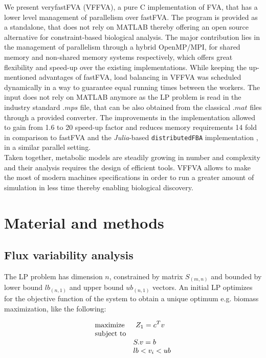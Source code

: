 \documentclass[letterpaper, 10 pt, conference]{ieeeconf}  %
\begin{document}
We present veryfastFVA (VFFVA), a pure C implementation of FVA, that has a lower level management of parallelism over fastFVA. The program is provided as a standalone, that does not rely on MATLAB thereby offering an open source alternative for constraint-based biological analysis. The major contribution lies in the management of parallelism through a hybrid OpenMP/MPI, for shared memory and non-shared memory systems respectively, which offers great flexibility and speed-up over the existing implementations. While keeping the up-mentioned advantages of fastFVA, load balancing in VFFVA was scheduled dynamically \cite{suss2008common} in a way to guarantee equal running times between the workers. The input does not rely on MATLAB anymore as the LP problem is read in the industry standard $.mps$ file, that can be also obtained from the classical $.mat$ files through a provided converter. The improvements in the implementation allowed to gain from 1.6 to 20 speed-up factor and reduces memory requirements 14 fold in comparison to fastFVA and the \textit{Julia}-based \texttt{distributedFBA} implementation \cite{heirendt2016distributedfba}, in a similar parallel setting.\\
Taken together, metabolic models are steadily growing in number and complexity and their analysis requires the design of efficient tools. VFFVA allows to make the most of modern machines specifications in order to run a greater amount of simulation in less time thereby enabling biological discovery. 

\section{Material and methods}

\subsection{Flux variability analysis}
The LP problem has dimension $n$, constrained by matrix $S_{(m,n)}$ and bounded by lower bound $lb_{(n,1)}$ and upper bound $ub_{(n,1)}$ vectors. An initial LP optimizes for the objective function of the system to obtain a unique optimum e.g. biomass maximization, like the following:

\begin{equation} \label{eq:one}
\begin{array}{ll@{}ll}
\text{maximize}  & \displaystyle\ Z_{1}=c^{T}v &\\
\text{subject to}\\
& S.v=b \\
& lb<v_{i}<ub
\end{array}
\end{equation}
\end{document}
